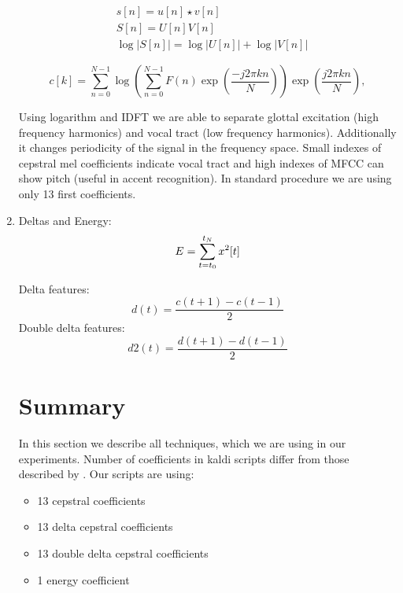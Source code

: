 \begin{enumerate}
		\begin{align}
		& s[n]=u[n] \star v[n] \\
		& S[n]=U[n]V[n] \\
		& \log |S[n]|= \log |U[n]| + \log |V[n]| 
		\end{align}

		\begin{equation}
			c[k]= \sum\limits^{N-1}_{n=0} \log \left( \sum\limits^{N-1}_{n=0} F(n)\exp\left(\frac{-j2\pi kn}{N} \right) \right) \exp\left(\frac{j2\pi kn}{N} \right), 
		\end{equation}

		Using logarithm and IDFT we are able to separate glottal excitation (high frequency harmonics) and vocal tract (low frequency harmonics). Additionally it changes periodicity of the signal in the frequency space. Small indexes of cepstral mel coefficients indicate vocal tract and high indexes of MFCC can show pitch (useful in accent recognition). In standard procedure we are using only 13 first coefficients.

	\item Deltas and Energy:
	\begin{equation}
		E = \operatorname*{\sum}_{t=t_0}^{t_N} x^2[t]
	\end{equation}

	Delta features:
	\begin{equation}
		d(t)=\frac{c(t+1)-c(t-1)}{2}	
	\end{equation}
	Double delta features:
	\begin{equation}
		d2(t)=\frac{d(t+1)-d(t-1)}{2}	
	\end{equation}

\section{Summary}

In this section we describe all techniques, which we are using in our experiments. Number of coefficients in kaldi scripts differ from those described by \textcite{jurafsky}. Our scripts are using:

\begin{itemize}
	\item 13 cepstral coefficients
	\item 13 delta cepstral coefficients 
	\item 13 double delta cepstral coefficients
	\item 1 energy coefficient
\end{itemize}






\end{enumerate}


